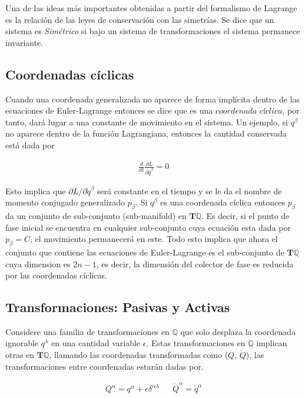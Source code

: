 Una de las ideas más importantes obtenidas a partir del formalismo de Lagrange es la relación de las leyes de conservación con las simetrías. Se dice que un sistema es \textit{Simétrico} si bajo un sistema de transformaciones el sistema permanece invariante. 

\subsection[short]{Coordenadas cíclicas}

Cuando una coordenada generalizada no aparece de forma implícita dentro de las ecuaciones de Euler-Lagrange entonces se dice que es una $\textit{coordenada cíclica}$, por tanto, dará lugar a una constante de movimiento en el sistema. Un ejemplo, si $q^{\beta}$ no aparece dentro de la función Lagrangiana, entonces la cantidad conservada está dada por

\begin{gather*}
    \frac{d}{dt}\frac{\partial L}{\partial \dot{q}^{\beta}} = 0
\end{gather*}

Esto implica que $\partial L/ \partial \dot{q}^\beta$ será constante en el tiempo y se le da el nombre de momento conjugado generalizado $p_\beta$. Si $q^{\beta}$ es una coordenada cíclica entonces $p_\beta$ da un conjunto de sub-conjunto (sub-manifold) en $\mathbf{T}\mathbb{Q}$. Es decir, si el punto de fase inicial se encuentra en cualquier sub-conjunto cuya ecuación esta dada por $p_\beta = C$, el movimiento permanecerá en este. Todo esto implica que ahora el conjunto que contiene las ecuaciones de Euler-Lagrange es el sub-conjunto de $\mathbf{T}\mathbb{Q}$ cuya dimension  es $2n - 1$, es decir, la dimensión del colector de fase es reducida por las coordenadas cíclicas.

\subsection[short]{Transformaciones: Pasivas y Activas}

Considere una familia de transformaciones en $\mathbb{Q}$ que solo desplaza la coordenada ignorable $q^{\lambda}$ en una cantidad variable $\epsilon$. Estas transformaciones en $\mathbb{Q}$ implican otras en $\mathbf{T}\mathbb{Q}$, llamando las coordenadas transformadas como ($Q$, $\dot{Q}$), las transformaciones entre coordenadas estarán dadas por.

\begin{align*}
    Q^{\alpha} = q^{\alpha} + \epsilon\delta^{\alpha\lambda} && \dot{Q}^{\alpha} = \dot{q}^{\alpha}
\end{align*}
